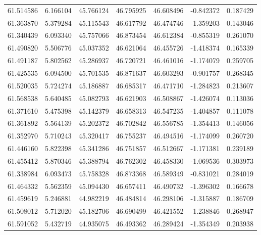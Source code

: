 \begin{tabular}{rrrrrrr}
 61.514586 &   6.166104 &         45.766124 &         46.795925 &         46.608496 & -0.842372 &  0.187429 \\
 61.363870 &   5.379284 &         45.115543 &         46.617792 &         46.474746 & -1.359203 &  0.143046 \\
 61.340439 &   6.093340 &         45.757066 &         46.873454 &         46.612384 & -0.855319 &  0.261070 \\
 61.490820 &   5.506776 &         45.037352 &         46.621064 &         46.455726 & -1.418374 &  0.165339 \\
 61.491187 &   5.802562 &         45.286937 &         46.720721 &         46.461016 & -1.174079 &  0.259705 \\
 61.425535 &   6.094500 &         45.701535 &         46.871637 &         46.603293 & -0.901757 &  0.268345 \\
 61.520035 &   5.724274 &         45.186887 &         46.685317 &         46.471710 & -1.284823 &  0.213607 \\
 61.568538 &   5.640485 &         45.082793 &         46.621903 &         46.508867 & -1.426074 &  0.113036 \\
 61.371610 &   5.475398 &         45.142379 &         46.658313 &         46.547235 & -1.404857 &  0.111078 \\
 61.361892 &   5.564139 &         45.202372 &         46.702842 &         46.556785 & -1.354413 &  0.146056 \\
 61.352970 &   5.710243 &         45.320417 &         46.755237 &         46.494516 & -1.174099 &  0.260720 \\
 61.446160 &   5.822398 &         45.341286 &         46.751857 &         46.512667 & -1.171381 &  0.239189 \\
 61.455412 &   5.870346 &         45.388794 &         46.762302 &         46.458330 & -1.069536 &  0.303973 \\
 61.338984 &   6.093473 &         45.758328 &         46.873368 &         46.589349 & -0.831021 &  0.284019 \\
 61.464332 &   5.562359 &         45.094430 &         46.657411 &         46.490732 & -1.396302 &  0.166678 \\
 61.459619 &   5.246881 &         44.982219 &         46.484814 &         46.298106 & -1.315887 &  0.186709 \\
 61.508012 &   5.712020 &         45.182706 &         46.690499 &         46.421552 & -1.238846 &  0.268947 \\
 61.591052 &   5.432719 &         44.935075 &         46.493362 &         46.289424 & -1.354349 &  0.203938 \\

\end{tabular}
